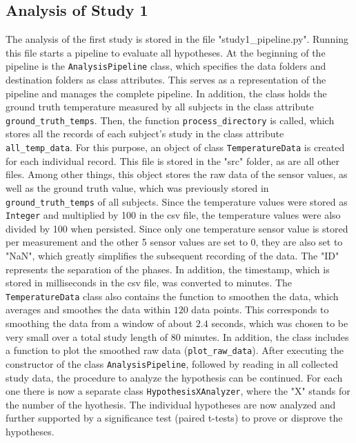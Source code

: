 \subsection{Analysis of Study 1}
The analysis of the first study is stored in the file "study1\_pipeline.py". 
Running this file starts a pipeline to evaluate all hypotheses.
At the beginning of the pipeline is the \texttt{AnalysisPipeline} class, which specifies the data folders and destination folders as class attributes. 
This serves as a representation of the pipeline and manages the complete pipeline.
In addition, the class holds the ground truth temperature measured by all subjects in the class attribute \texttt{ground\_truth\_temps}.
Then, the function \texttt{process\_directory} is called, which stores all the records of each subject's study in the class attribute \texttt{all\_temp\_data}.
For this purpose, an object of class \texttt{TemperatureData} is created for each individual record.
This file is stored in the "src" folder, as are all other files.
Among other things, this object stores the raw data of the sensor values, as well as the ground truth value, which was previously stored in \texttt{ground\_truth\_temps} of all subjects.
Since the temperature values were stored as \texttt{Integer} and multiplied by 100 in the csv file, the temperature values were also divided by 100 when persisted.
Since only one temperature sensor value is stored per measurement and the other 5 sensor values are set to 0, they are also set to "NaN", which greatly simplifies the subsequent recording of the data.
The "ID" represents the separation of the phases.
In addition, the timestamp, which is stored in milliseconds in the csv file, was converted to minutes.
The \texttt{TemperatureData} class also contains the function to smoothen the data, which averages and smoothes the data within $120$ data points.
This corresponds to smoothing the data from a window of about $2.4$ seconds, which was chosen to be very small over a total study length of 80 minutes.
In addition, the class includes a function to plot the smoothed raw data (\texttt{plot\_raw\_data}).
After executing the constructor of the class \texttt{AnalysisPipeline}, followed by reading in all collected study data, the procedure to analyze the hypothesis can be continued.
For each one there is now a separate class \texttt{HypothesisXAnalyzer}, where the "X" stands for the number of the hyothesis.
The individual hypotheses are now analyzed and further supported by a significance test (paired t-tests) to prove or disprove the hypotheses.

